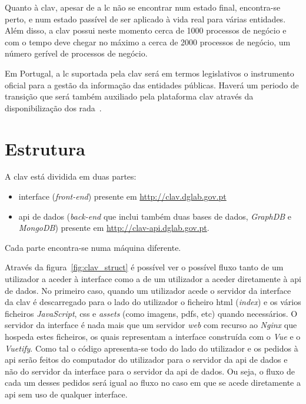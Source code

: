Quanto à \acrshort{clav}, apesar de a \acrshort{lc} não se encontrar num estado final, encontra-se perto, e num estado passível de ser aplicado à vida real para várias entidades. Além disso, a \acrshort{clav} possui neste momento cerca de 1000 processos de negócio e com o tempo deve chegar no máximo a cerca de 2000 processos de negócio, um número gerível de processos de negócio.

Em Portugal, a \acrshort{lc} suportada pela \acrshort{clav} será em termos legislativos o instrumento oficial para a gestão da informação das entidades públicas. Haverá um periodo de transição que será também auxiliado pela plataforma \acrshort{clav} através da disponibilização dos \acrshort{rada}~\cite{rada}.

\section{Estrutura}
A \acrshort{clav} está dividida em duas partes:
\begin{itemize}
    \item interface (\textit{front-end}) presente em \url{http://clav.dglab.gov.pt}
    \item \acrshort{api} de dados (\textit{back-end} que inclui também duas bases de dados, \textit{GraphDB} e \textit{MongoDB}) presente em \url{http://clav-api.dglab.gov.pt}.
\end{itemize}

Cada parte encontra-se numa máquina diferente.

Através da figura~\ref{fig:clav_struct} é possível ver o possível fluxo tanto de um utilizador a aceder à interface como a de um utilizador a aceder diretamente à \acrshort{api} de dados. No primeiro caso, quando um utilizador acede o servidor da interface da \acrshort{clav} é descarregado para o lado do utilizador o ficheiro \acrshort{html} (\textit{index}) e os vários ficheiros \textit{JavaScript}, \acrshort{css} e \textit{assets} (como imagens, \acrshort{pdf}s, etc) quando necessários. O servidor da interface é nada mais que um servidor \textit{web} com recurso ao \textit{Nginx} que hospeda estes ficheiros, os quais representam a interface construída com o \textit{Vue} e o \textit{Vuetify}. Como tal o código apresenta-se todo do lado do utilizador e os pedidos à \acrshort{api} serão feitos do computador do utilizador para o servidor da \acrshort{api} de dados e não do servidor da interface para o servidor da \acrshort{api} de dados. Ou seja, o fluxo de cada um desses pedidos será igual ao fluxo no caso em que se acede diretamente a \acrshort{api} sem uso de qualquer interface.

